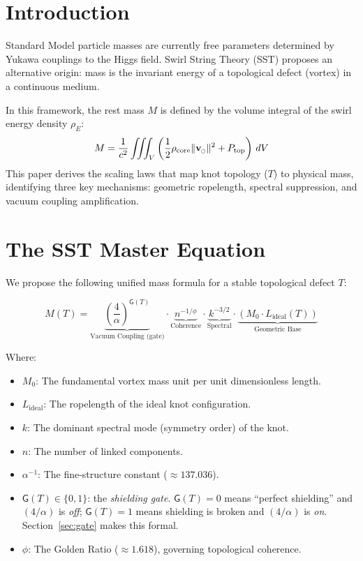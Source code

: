 \documentclass[11pt, a4paper]{article}
\newcommand{\swirlarrow}{%
  \mathchoice{\mkern-2mu\scriptstyle\boldsymbol{\circlearrowleft}}%
             {\mkern-2mu\scriptstyle\boldsymbol{\circlearrowleft}}%
             {\mkern-2mu\scriptscriptstyle\boldsymbol{\circlearrowleft}}%
             {\mkern-2mu\scriptscriptstyle\boldsymbol{\circlearrowleft}}%
}
\newcommand{\vswirl}{\mathbf{v}_{\swirlarrow}}
\newcommand{\vnorm}{\lVert \vswirl \rVert}
\begin{document}
\section{Introduction}
Standard Model particle masses are currently free parameters determined by Yukawa couplings to the Higgs field. Swirl String Theory (SST) proposes an alternative origin: mass is the invariant energy of a topological defect (vortex) in a continuous medium.

In this framework, the rest mass $M$ is defined by the volume integral of the swirl energy density $\rho_E$:
\begin{equation}
    M = \frac{1}{c^2} \iiint_V \left( \frac{1}{2}\rho_{\text{core}} \vnorm^2 + P_{\text{top}} \right)\, dV
\end{equation}
This paper derives the scaling laws that map knot topology ($T$) to physical mass, identifying three key mechanisms: geometric ropelength, spectral suppression, and vacuum coupling amplification.

\section{The SST Master Equation}
We propose the following unified mass formula for a stable topological defect $T$:

\begin{equation}
    M(T) =
    \underbrace{\left( \frac{4}{\alpha} \right)^{\mathsf{G}(T)}}_{\text{Vacuum Coupling (gate)}}
    \cdot \underbrace{n^{-1/\phi}}_{\text{Coherence}}
    \cdot \underbrace{k^{-3/2}}_{\text{Spectral}}
    \cdot \underbrace{\left( M_0 \cdot L_{\text{ideal}}(T) \right)}_{\text{Geometric Base}}
\end{equation}

Where:
\begin{itemize}
    \item $M_0$: The fundamental vortex mass unit per unit dimensionless length.
    \item $L_{\text{ideal}}$: The ropelength of the ideal knot configuration.
    \item $k$: The dominant spectral mode (symmetry order) of the knot.
    \item $n$: The number of linked components.
    \item $\alpha^{-1}$: The fine-structure constant ($\approx 137.036$).
    \item $\mathsf{G}(T)\in\{0,1\}$: the \emph{shielding gate}.  \(\mathsf{G}(T)=0\) means ``perfect shielding'' and \((4/\alpha)\) is \emph{off};
    \(\mathsf{G}(T)=1\) means shielding is broken and \((4/\alpha)\) is \emph{on}.  Section~\ref{sec:gate} makes this formal.
    \item $\phi$: The Golden Ratio ($\approx 1.618$), governing topological coherence.
\end{itemize}
\end{document}
